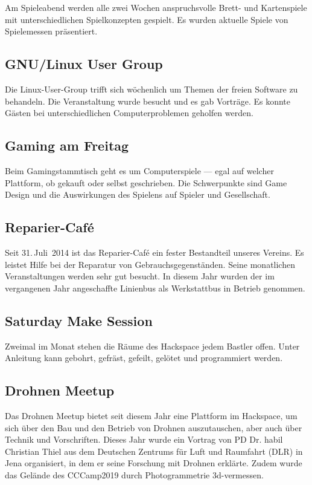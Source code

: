 \documentclass[ngerman]{scrartcl}
\begin{document}
Am Spieleabend werden alle zwei Wochen anspruchsvolle Brett- und
Kartenspiele mit unterschiedlichen Spielkonzepten gespielt.
Es wurden aktuelle Spiele von Spielemessen präsentiert.

\subsection{GNU/Linux User Group}

Die Linux-User-Group trifft sich wöchenlich um Themen der freien Software
zu behandeln. Die Veranstaltung wurde besucht und es gab Vorträge. Es
konnte Gästen bei unterschiedlichen Computerproblemen geholfen werden.

\subsection{Gaming am Freitag}

Beim Gamingstammtisch geht es um Computerspiele — egal auf welcher
Plattform, ob gekauft oder selbst geschrieben. Die Schwerpunkte sind
Game Design und die Auswirkungen des Spielens auf Spieler und
Gesellschaft.

\subsection{Reparier-Café}

Seit 31.\,Juli~2014 ist das Reparier-Café ein fester Bestandteil unseres Vereins.
Es leistet Hilfe bei der Reparatur von Gebrauchsgegenständen.
Seine monatlichen Veranstaltungen werden sehr gut besucht. In diesem Jahr wurden
der im vergangenen Jahr angeschaffte Linienbus als Werkstattbus in Betrieb genommen.

\subsection{Saturday Make Session}

Zweimal im Monat stehen die Räume des Hackspace jedem Bastler offen. Unter
Anleitung kann gebohrt, gefräst, gefeilt, gelötet und programmiert werden.

\subsection{Drohnen Meetup}

Das Drohnen Meetup bietet seit diesem Jahr eine Plattform im Hackspace, um sich über den Bau und den Betrieb von Drohnen auszutauschen, aber auch über Technik und Vorschriften. Dieses Jahr wurde ein Vortrag von PD Dr. habil Christian Thiel aus dem Deutschen Zentrums für Luft und Raumfahrt (DLR) in Jena organisiert, in dem er seine Forschung mit Drohnen erklärte. Zudem wurde das Gelände des CCCamp2019 durch Photogrammetrie 3d-vermessen.
\end{document}
